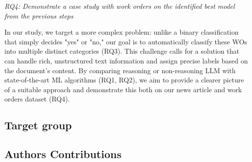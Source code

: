 \bigskip
\textit{RQ4: Demonstrate a case study with work orders on the identified best model from the previous steps} %

In our study, we target a more complex problem: unlike a binary classification that simply decides "yes" or "no," our goal is to automatically classify these WOs into multiple distinct categories (RQ3). This challenge calls for a solution that can handle rich, unstructured text information and assign precise labels based on the document’s content. By comparing reasoning or non-reasoning LLM with state-of-the-art ML algorithms (RQ1, RQ2), we aim to provide a clearer picture of a suitable approach and demonstrate this both on our news article and work orders dataset (RQ4).

\subsection{Target group}
\subsection{Authors Contributions}